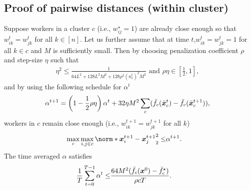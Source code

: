 \documentclass{article}
\begin{document}
\subsection{Proof of pairwise distances (within cluster)}
\begin{lemma}[]
  \label{lemma:within-cluster}
  Suppose workers in a cluster $c$ (i.e., $w_{ij}^\star=1$) are already close enough so that $w_{ik}^t=w_{jk}^t$ for all $k\in[n]$. Let us further assume that at time $t$,$w_{ik}^t=w_{jk}^t=1$ for all $k\in c$ and $M$ is sufficiently small. Then by choosing penalization coefficient $\rho$ and step-size $\eta$ such that
  \begin{align*}
    \eta^2 \le \frac{1}{64L^2 + 128L^2M^2 + 128\rho^2(n_c^t)^2M^2} \text{ and } \rho\eta \in \left[\frac{1}{2},1\right],
  \end{align*}
  and by using the following schedule for $\alpha^t$
  \begin{align*}
    \alpha^{t+1} = \left(1 - \frac{1}{2}\rho\eta \right) \alpha^t + 32\eta M^2\sum_c(\bar{f}_c(\bar{\bm{x}}_c^{t}) - \bar{f}_c(\bar{\bm{x}}_c^{t+1})),
  \end{align*}
  workers in $c$ remain close enough (i.e., $w_{ik}^{t+1}=w_{jk}^{t+1}$ for all $k$)
  \begin{align*}
    \max_c\max_{i,j\in c} \norm*{\xx_i^{t+1} - \xx_j^{t+1}}_2^2 \le& \alpha^{t+1}.
  \end{align*}
  The time averaged $\alpha$ satisfies
  \begin{align*}
    \frac{1}{T}\sum_{t=0}^{T-1} \alpha^t
    \le&   \frac{64M^2 (\bar{f}_c(\bm{x}^0) - \bar{f}_c^\star)}{\rho c T} .
  \end{align*}

\end{lemma}
\end{document}
